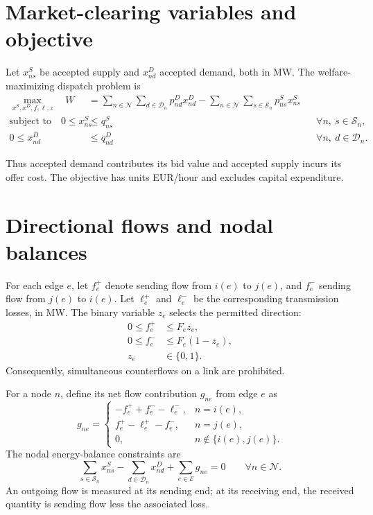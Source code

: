 \documentclass[11pt]{article}
\begin{document}
\section{Market-clearing variables and objective}

Let \(x^S_{ns}\) be accepted supply and \(x^D_{nd}\) accepted demand, both in
MW. The welfare-maximizing dispatch problem is
\begin{align}
\max_{x^S,x^D,f,\ell,z}\quad
W &=
\sum_{n\in\mathcal{N}}\sum_{d\in\mathcal{D}_n}
    p^D_{nd}x^D_{nd}
-\sum_{n\in\mathcal{N}}\sum_{s\in\mathcal{S}_n}
    p^S_{ns}x^S_{ns}
\label{eq:welfare}\\
\text{subject to}\quad
0\le x^S_{ns} &\le q^S_{ns}
&& \forall n,\ s\in\mathcal{S}_n,
\label{eq:supply-bounds}\\
0\le x^D_{nd} &\le q^D_{nd}
&& \forall n,\ d\in\mathcal{D}_n.
\label{eq:demand-bounds}
\end{align}

Thus accepted demand contributes its bid value and accepted supply incurs its
offer cost. The objective has units EUR/hour and excludes capital expenditure.

\section{Directional flows and nodal balances}

For each edge \(e\), let \(f_e^+\) denote sending flow from \(i(e)\) to
\(j(e)\), and \(f_e^-\) sending flow from \(j(e)\) to \(i(e)\). Let
\(\ell_e^+\) and \(\ell_e^-\) be the corresponding transmission losses, in MW.
The binary variable \(z_e\) selects the permitted direction:
\begin{align}
0\le f_e^+ &\le F_e z_e,\\
0\le f_e^- &\le F_e(1-z_e),\\
z_e &\in \{0,1\}.
\end{align}
Consequently, simultaneous counterflows on a link are prohibited.

For a node \(n\), define its net flow contribution \(g_{ne}\) from edge \(e\)
as
\[
g_{ne} =
\begin{cases}
-f_e^+ + f_e^- - \ell_e^-,
    & n=i(e),\\[2pt]
 f_e^+ - \ell_e^+ - f_e^-,
    & n=j(e),\\[2pt]
0, & n\notin\{i(e),j(e)\}.
\end{cases}
\]
The nodal energy-balance constraints are
\begin{equation}
\sum_{s\in\mathcal{S}_n}x^S_{ns}
-\sum_{d\in\mathcal{D}_n}x^D_{nd}
+\sum_{e\in\mathcal{E}}g_{ne}=0
\qquad \forall n\in\mathcal{N}.
\label{eq:balance}
\end{equation}
An outgoing flow is measured at its sending end; at its receiving end, the
received quantity is sending flow less the associated loss.
\end{document}
